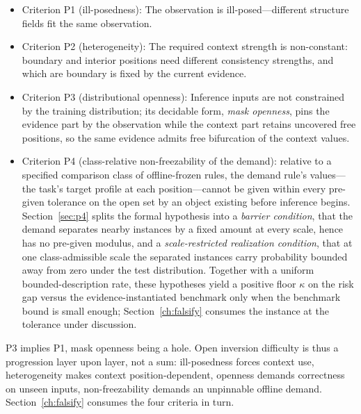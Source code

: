 \begin{itemize}
\item Criterion P1 (ill-posedness): The observation is ill-posed---different structure fields fit the same observation.
\item Criterion P2 (heterogeneity): The required context strength is non-constant: boundary and interior positions need different consistency strengths, and which are boundary is fixed by the current evidence.
\item Criterion P3 (distributional openness): Inference inputs are not constrained by the training distribution; its decidable form, \emph{mask openness}, pins the evidence part by the observation while the context part retains uncovered free positions, so the same evidence admits free bifurcation of the context values.
\item Criterion P4 (class-relative non-freezability of the demand): relative to a specified comparison class of offline-frozen rules, the demand rule's values---the task's target profile at each position---cannot be given within every pre-given tolerance on the open set by an object existing before inference begins. Section~\ref{sec:p4} splits the formal hypothesis into a \emph{barrier condition}, that the demand separates nearby instances by a fixed amount at every scale, hence has no pre-given modulus, and a \emph{scale-restricted realization condition}, that at one class-admissible scale the separated instances carry probability bounded away from zero under the test distribution. Together with a uniform bounded-description rate, these hypotheses yield a positive floor $\kappa$ on the risk gap versus the evidence-instantiated benchmark only when the benchmark bound is small enough; Section~\ref{ch:falsify} consumes the instance at the tolerance under discussion.
\end{itemize}

P3 implies P1, mask openness being a hole. Open inversion difficulty is thus a progression layer upon layer, not a sum: ill-posedness forces context use, heterogeneity makes context position-dependent, openness demands correctness on unseen inputs, non-freezability demands an unpinnable offline demand. Section~\ref{ch:falsify} consumes the four criteria in turn.

